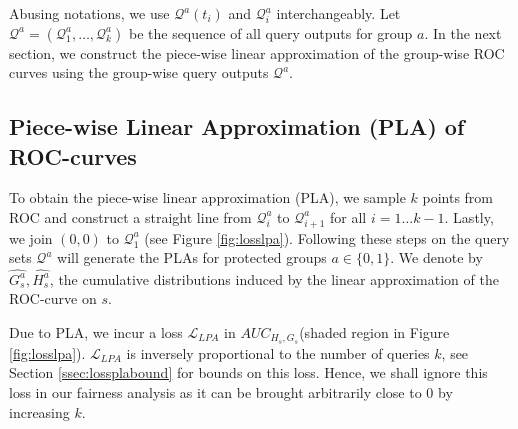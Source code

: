 \documentclass{article}
\begin{document}
Abusing notations, we use $\mathcal{Q}^a(t_i)$ and $\mathcal{Q}^a_i$ interchangeably. Let $\mathcal{Q}^a = (\mathcal{Q}^a_1, \ldots, \mathcal{Q}^a_k)$ be the sequence of all query outputs for group $a$. In the next section, we construct the piece-wise linear approximation of the group-wise ROC curves using the group-wise query outputs $\mathcal{Q}^a$.

\subsection{Piece-wise Linear Approximation (PLA) of ROC-curves} \label{ssec:pla}
To obtain the piece-wise linear approximation (PLA), we sample $k$ points from ROC and construct a straight line from $\mathcal{Q}_i^a$ to $\mathcal{Q}_{i+1}^a$ for all $i = 1 \ldots k-1$. Lastly, we join $(0,0)$ to $\mathcal{Q}_1^a$ (see Figure \ref{fig:losslpa}). Following these steps on the query sets $\mathcal{Q}^a$ will generate the PLAs for protected groups $a \in \{0,1\}$.
We denote by $\widehat{G_s^{a}}, \widehat{H_s^{a}}$, the cumulative distributions induced by the linear approximation of the ROC-curve on $s$.

Due to PLA, we incur a loss $\mathcal{L}_{LPA}$ in $AUC_{H_s, G_s}$(shaded region in Figure \eqref{fig:losslpa}). $\mathcal{L}_{LPA}$ is inversely proportional to the number of queries $k$, see Section \ref{ssec:lossplabound} for bounds on this loss. Hence, we shall ignore this loss in our fairness analysis as it can be brought  arbitrarily close to $0$ by increasing $k$.  
\end{document}
